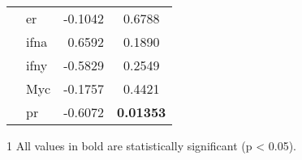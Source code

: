 \begin{table}[htpb]
\begin{threeparttable}
\begin{tabular}{llrc}
                                                                           & \gls{er}   & -0.1042   & 0.6788 \\
                                                                           & \gls{ifna} & 0.6592    & 0.1890 \\
                                                                           & \gls{ifny} & -0.5829   & 0.2549 \\
                                                                           & Myc        & -0.1757   & 0.4421 \\
                                                                           & \gls{pr}   & -0.6072   & \bfseries 0.01353  \\
				\hline
				\hline
			\end{tabular}
			\begin{tablenotes}
				\begin{footnotesize}
				\item [1] All values in bold are statistically significant (p \textless{} 0.05).
				\end{footnotesize}
			\end{tablenotes}
		\end{threeparttable}
	\end{table}

